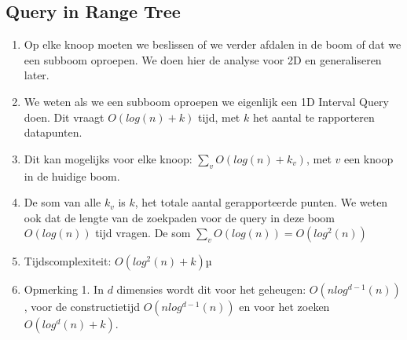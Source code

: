 \documentclass[12pt,a4paper]{article}
\begin{document}
		\subsection{Query in Range Tree}
		\begin{enumerate}
			\item Op elke knoop moeten we beslissen of we verder afdalen in de boom of dat we een subboom oproepen. We doen hier de analyse voor 2D en generaliseren later.
			\item We weten als we een subboom oproepen we eigenlijk een 1D Interval Query doen. Dit vraagt $O(log (n) + k)$ tijd, met $k$ het aantal te rapporteren datapunten.
			\item Dit kan mogelijks voor elke knoop: $\sum_{v}O(log (n) + k_v)$, met $v$ een knoop in de huidige boom. 
			\item De som van alle $k_v$ is $k$, het totale aantal gerapporteerde punten. We weten ook dat de lengte van de zoekpaden voor de query in deze boom $O(log (n))$ tijd vragen. De som $\sum_{v}O(log (n)) = O(log^2 (n))$
			\item Tijdscomplexiteit: $O(log^2 (n) + k)$µ
			\item Opmerking 1. In $d$ dimensies wordt dit voor het geheugen: $O(n log^{d-1} (n))$, voor de constructietijd $O(n log^{d-1} (n))$ en voor het zoeken $O(log^{d} (n) + k)$. 
		\end{enumerate}
\end{document}
